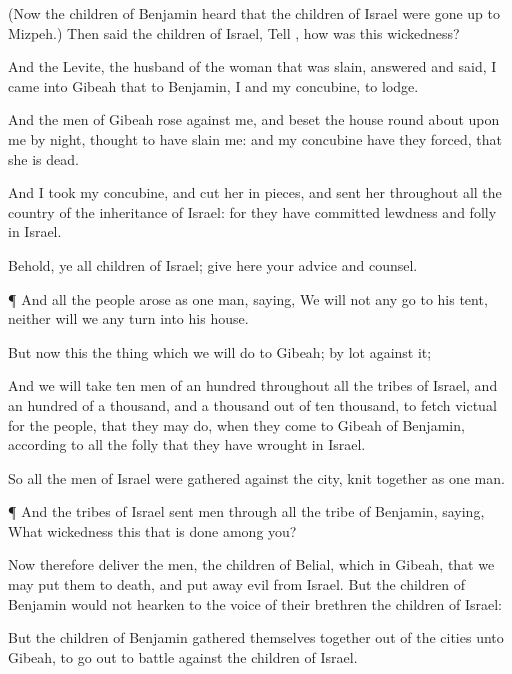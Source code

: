 {(Now the
children of
Benjamin
heard that the
children of
Israel were gone
up to
Mizpeh.) Then
said the
children of
Israel,
Tell
{}, how
was this
wickedness?

And the
Levite, the
husband of the
woman that was
slain,
answered and
said, I
came into
Gibeah that
{} to
Benjamin, I and my
concubine, to
lodge.

And the
men of
Gibeah
rose against me, and
beset the
house round
about upon me by
night,
{}
thought to have
slain me: and my
concubine have they
forced, that she is
dead.

And I
took my
concubine, and cut her in
pieces, and
sent her throughout all the
country of the
inheritance of
Israel: for they have
committed
lewdness and
folly in
Israel.

Behold, ye
{} all
children of
Israel;
give
here your
advice and
counsel.


\par }{\PP {}¶ And all the
people
arose as
one
man,
saying, We will not
any
{}
go to his
tent, neither will we
any
{}
turn into his
house.

But now this
{} the
thing which we will
do to
Gibeah;
{} by
lot against it;

And we will
take
ten
men of an
hundred throughout all the
tribes of
Israel, and an
hundred of a
thousand, and a
thousand out of ten
thousand, to
fetch
victual for the
people, that they may
do, when they
come to
Gibeah of
Benjamin, according to all the
folly that they have
wrought in
Israel.

So all the
men of
Israel were
gathered against the
city, knit
together as
one
man.


\par }{\PP {}¶ And the
tribes of
Israel
sent
men through all the
tribe of
Benjamin,
saying, What
wickedness
{} this that is
done among you?

Now therefore
deliver
{} the
men, the
children of
Belial, which
{} in
Gibeah, that we may put them to
death, and put
away
evil from
Israel. But the
children of
Benjamin
would not
hearken to the
voice of their
brethren the
children of
Israel:

But the
children of
Benjamin gathered themselves
together out of the
cities unto
Gibeah, to go
out to
battle against the
children of
Israel.

}
